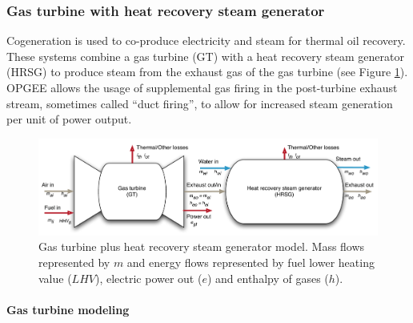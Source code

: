 \documentclass[11pt]{report}
\newcommand{\marg}[1]{{\footnotesize\textit{\textcolor{stanford}{'#1'}}}}
\newcommand{\marginnote}[1]{\marginpar{\marg{#1}}}
\begin{document}
\subsubsection{Gas turbine with heat recovery steam generator}

Cogeneration is used to co-produce electricity and steam for thermal oil recovery. \marginnote{Steam Generation 2.3} These systems combine a gas turbine (GT) with a heat recovery steam generator (HRSG) to produce steam from the exhaust gas of the gas turbine (see Figure \ref{fig:GT-HRSG}).  OPGEE allows the usage of supplemental gas firing in the post-turbine exhaust stream, sometimes called ``duct firing'', to allow for increased steam generation per unit of power output.

\begin{figure}[t]
\includegraphics[width=1\columnwidth]{images/GT+HRSG.pdf}
\caption{Gas turbine plus heat recovery steam generator model. Mass flows represented by $m$ and energy flows represented by fuel lower heating value ($LHV$), electric power out ($e$) and enthalpy of gases ($h$).}
\label{fig:GT-HRSG}
\end{figure}

\paragraph{Gas turbine modeling} 
\end{document}
